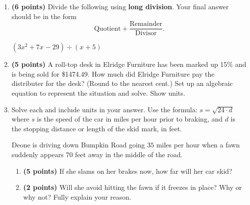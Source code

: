 \documentclass[12pt]{amsart}
\begin{document}
\begin{enumerate}
  
\vfill \vfill \vfill
\def \a{5}\def \b{3}\def \c{-8}\def \r{11}\def \monicpol{x^{}+5}\def \longnbad{3x^{2}+7x^{}-29}\def \anspol{3x^{}-8}
\item {\bf (6 points)} 
 Divide the following using {\bf long division}. Your final answer should be in the form $$ \text{Quotient} + \dfrac{\text{Remainder}}{\text{Divisor}}.$$

\vspace{3mm}

$(\longnbad) \div (\monicpol)$

\vfill  \vfill \vfill
\newpage\def \discount{15}\def \paid{1474.49}\def \rainy{12.05}\def \orcost{1734.69}\def \purcost{1282.17}\def \orrainy{14.18}
\item {\bf (5 points)} 
 A roll-top desk in Elridge Furniture has been marked up \discount\% and is being sold for \$\paid. How much did Elridge Furniture pay the distributer for the desk? (Round to the nearest cent.) Set up an algebraic equation to represent the situation and solve. Show units.

\vfill 
\def \insvar{24}\def \d{70}\def \zerospeed{40.99}\def \slimit{35}\def \s{45}\def \skidd{84.375}\def \safed{51.042}\def \rsafed{51}

 
\item Solve each and include units in your answer. Use the formula: $s = \sqrt{\insvar \cdot d}$ where $s$ is the speed of the car in miles per hour prior to braking, and $d$ is the stopping distance or length of the skid mark, in feet. 

\vspace{3mm}

Deone is driving down Bumpkin Road going $\slimit$ miles per hour when a fawn suddenly appears $\d$ feet away in the middle of the road. \begin{enumerate}
\item {\bf (5 points)} If she slams on her brakes now, how far will her car skid? \vspace{4cm}
\item {\bf (2 points)} Will she avoid hitting the fawn if it freezes in place? Why or why not? Fully explain your reason. \vspace{3cm}
\end{enumerate}



\end{enumerate}
\end{document}
